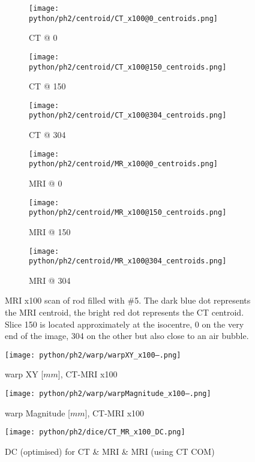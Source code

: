 \begin{figure}[!tbp]
  \begin{subfigure}[b]{0.32\textwidth}
    \texttt{[image: python/ph2/centroid/CT\_x100@0\_centroids.png]}
    \caption{CT @ 0}
    \label{fig:CT_x100_centroids@0}
  \end{subfigure}
  \begin{subfigure}[b]{0.32\textwidth}
    \texttt{[image: python/ph2/centroid/CT\_x100@150\_centroids.png]}
    \caption{CT @ 150}
    \label{fig:CT_x100_centroids@150}
  \end{subfigure}
  \begin{subfigure}[b]{0.32\textwidth}
    \texttt{[image: python/ph2/centroid/CT\_x100@304\_centroids.png]}
    \caption{CT @ 304}
    \label{fig:CT_x100_centroids@304}
  \end{subfigure}
  \begin{subfigure}[b]{0.32\textwidth}
    \texttt{[image: python/ph2/centroid/MR\_x100@0\_centroids.png]}
    \caption{MRI @ 0}
    \label{fig:MR_x100_centroids@0}
  \end{subfigure}
  \begin{subfigure}[b]{0.32\textwidth}
    \texttt{[image: python/ph2/centroid/MR\_x100@150\_centroids.png]}
    \caption{MRI @ 150}
    \label{fig:MR_x100_centroids@150}
  \end{subfigure}
  \begin{subfigure}[b]{0.32\textwidth}
    \texttt{[image: python/ph2/centroid/MR\_x100@304\_centroids.png]}
    \caption{MRI @ 304}
    \label{fig:MR_x100_centroids@304}
  \end{subfigure}
  \caption{MRI x100 scan of rod filled with \#5. The dark blue dot represents the MRI centroid, the bright red dot represents the CT centroid.
  			\\ Slice 150 is located approximately at the isocentre, 0 on the very end of the image, 304 on the other but also close to an air bubble.}
  \label{fig:MR_x100_centroids}
\end{figure}


\begin{figure}[!bp]
  \centering
  \texttt{[image: python/ph2/warp/warpXY\_x100--.png]}
  \caption{warp XY [$mm$], CT-MRI x100}
  \label{fig:warpXY_x100}
\end{figure}

\begin{figure}[!tp]
    \centering
    \texttt{[image: python/ph2/warp/warpMagnitude\_x100--.png]}
    \caption{warp Magnitude [$mm$], CT-MRI x100}
    \label{fig:warpMagnitude_x100}
\end{figure}
\begin{figure}[!bp]
    \centering
    \texttt{[image: python/ph2/dice/CT\_MR\_x100\_DC.png]}
    \caption{DC (optimised) for CT \& MRI \& MRI (using CT COM)}
    \label{fig:CT_MR_x100_DC}
\end{figure}

